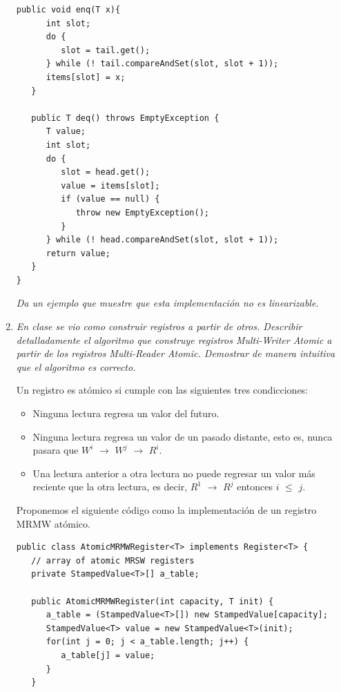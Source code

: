 \documentclass{article}
\begin{document}
\begin{enumerate}
{{\begin{lstlisting}[frame=single]
   public void enq(T x){
      int slot;
      do {
         slot = tail.get();
      } while (! tail.compareAndSet(slot, slot + 1));
      items[slot] = x;
   }

   public T deq() throws EmptyException {
      T value;
      int slot;
      do {
         slot = head.get();
         value = items[slot];
         if (value == null) {
            throw new EmptyException();
         }
      } while (! head.compareAndSet(slot, slot + 1));
      return value;
   }
}
\end{lstlisting}
    \textsl{Da un ejemplo que muestre que esta implementación no es
      linearizable.}

  }
}

\item{\textsl {
      En clase se vio como construir registros a partir de
      otros. Describir detalladamente el algoritmo que construye
      registros Multi-Writer Atomic a partir de los registros
      Multi-Reader Atomic. Demostrar de manera intuitiva que el
      algoritmo es correcto.\\
    }
    
    Un registro es atómico si cumple con las siguientes tres
    condicciones:

    \begin{itemize}
      
    \item{Ninguna lectura regresa un valor del futuro.}
    \item{Ninguna lectura regresa un valor de un pasado distante, esto
        es, nunca pasara que $W^i$ $\rightarrow$ $W^j$ $\rightarrow$ $
        R^i$.}
      \item{Una lectura anterior a otra lectura no puede regresar un
          valor más reciente que la otra lectura, es decir, $R^1$
          $\rightarrow$ $R^j$ entonces $i$ $\leq$ $j$.}
    \end{itemize}
  
    Proponemos el siguiente código como la implementación de un
    registro MRMW atómico.
    
    \renewcommand{\lstlistingname}{}
\begin{lstlisting}[frame=single]
public class AtomicMRMWRegister<T> implements Register<T> {
   // array of atomic MRSW registers
   private StampedValue<T>[] a_table;

   public AtomicMRMWRegister(int capacity, T init) {
      a_table = (StampedValue<T>[]) new StampedValue[capacity];
      StampedValue<T> value = new StampedValue<T>(init);
      for(int j = 0; j < a_table.length; j++) {
         a_table[j] = value;
      }
   }


\end{lstlisting}}
\end{enumerate}
\end{document}
